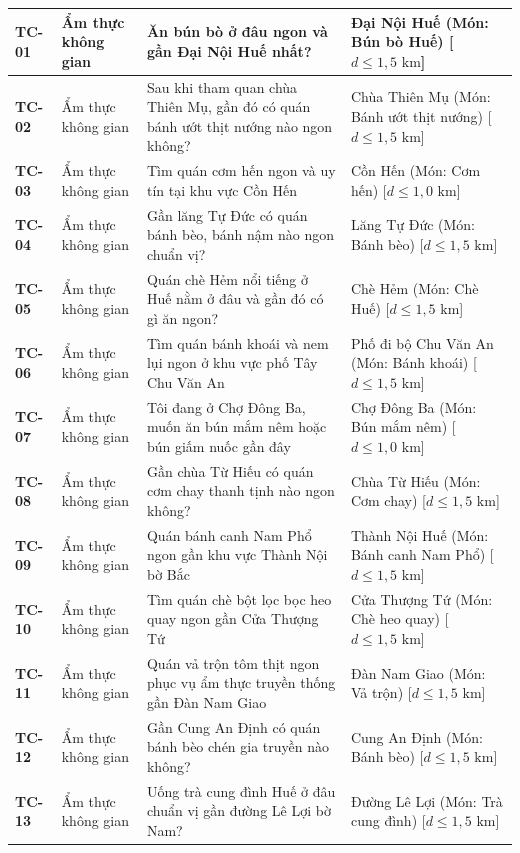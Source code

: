 \begin{longtable}{|>{\centering\arraybackslash\bfseries}p{1.35cm}|>{\raggedright\arraybackslash}p{2.6cm}|>{\raggedright\arraybackslash}p{6.35cm}|>{\raggedright\arraybackslash}p{4.3cm}|}
TC-01 & Ẩm thực không gian & Ăn bún bò ở đâu ngon và gần Đại Nội Huế nhất? & Đại Nội Huế (Món: Bún bò Huế) [$d \le 1{,}5\text{ km}$] \\ \hline
TC-02 & Ẩm thực không gian & Sau khi tham quan chùa Thiên Mụ, gần đó có quán bánh ướt thịt nướng nào ngon không? & Chùa Thiên Mụ (Món: Bánh ướt thịt nướng) [$d \le 1{,}5\text{ km}$] \\ \hline
TC-03 & Ẩm thực không gian & Tìm quán cơm hến ngon và uy tín tại khu vực Cồn Hến & Cồn Hến (Món: Cơm hến) [$d \le 1{,}0\text{ km}$] \\ \hline
TC-04 & Ẩm thực không gian & Gần lăng Tự Đức có quán bánh bèo, bánh nậm nào ngon chuẩn vị? & Lăng Tự Đức (Món: Bánh bèo) [$d \le 1{,}5\text{ km}$] \\ \hline
TC-05 & Ẩm thực không gian & Quán chè Hẻm nổi tiếng ở Huế nằm ở đâu và gần đó có gì ăn ngon? & Chè Hẻm (Món: Chè Huế) [$d \le 1{,}5\text{ km}$] \\ \hline
TC-06 & Ẩm thực không gian & Tìm quán bánh khoái và nem lụi ngon ở khu vực phố Tây Chu Văn An & Phố đi bộ Chu Văn An (Món: Bánh khoái) [$d \le 1{,}5\text{ km}$] \\ \hline
TC-07 & Ẩm thực không gian & Tôi đang ở Chợ Đông Ba, muốn ăn bún mắm nêm hoặc bún giấm nuốc gần đây & Chợ Đông Ba (Món: Bún mắm nêm) [$d \le 1{,}0\text{ km}$] \\ \hline
TC-08 & Ẩm thực không gian & Gần chùa Từ Hiếu có quán cơm chay thanh tịnh nào ngon không? & Chùa Từ Hiếu (Món: Cơm chay) [$d \le 1{,}5\text{ km}$] \\ \hline
TC-09 & Ẩm thực không gian & Quán bánh canh Nam Phổ ngon gần khu vực Thành Nội bờ Bắc & Thành Nội Huế (Món: Bánh canh Nam Phổ) [$d \le 1{,}5\text{ km}$] \\ \hline
TC-10 & Ẩm thực không gian & Tìm quán chè bột lọc bọc heo quay ngon gần Cửa Thượng Tứ & Cửa Thượng Tứ (Món: Chè heo quay) [$d \le 1{,}5\text{ km}$] \\ \hline
TC-11 & Ẩm thực không gian & Quán vả trộn tôm thịt ngon phục vụ ẩm thực truyền thống gần Đàn Nam Giao & Đàn Nam Giao (Món: Vả trộn) [$d \le 1{,}5\text{ km}$] \\ \hline
TC-12 & Ẩm thực không gian & Gần Cung An Định có quán bánh bèo chén gia truyền nào không? & Cung An Định (Món: Bánh bèo) [$d \le 1{,}5\text{ km}$] \\ \hline
TC-13 & Ẩm thực không gian & Uống trà cung đình Huế ở đâu chuẩn vị gần đường Lê Lợi bờ Nam? & Đường Lê Lợi (Món: Trà cung đình) [$d \le 1{,}5\text{ km}$] \\ \hline

\end{longtable}
